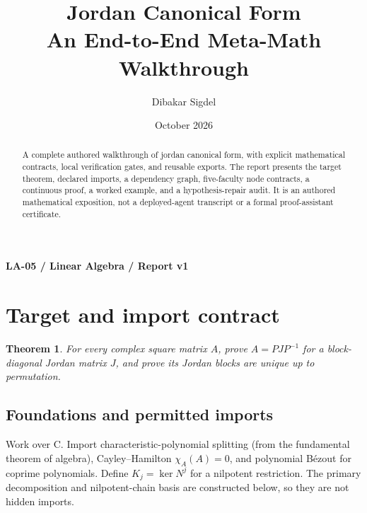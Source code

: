 \documentclass[preprint,12pt,aps,pra,showkeys,amsmath,amssymb,superscriptaddress,floatfix]{revtex4-2}
\newtheorem{theorem}{Theorem}[section]
\theoremstyle{definition}
\theoremstyle{remark}
\begin{document}
\title{Jordan Canonical Form\\[4pt]\large An End-to-End Meta-Math Walkthrough}

\author{Dibakar Sigdel}


\date{October 2026}

\begin{abstract}

A complete authored walkthrough of jordan canonical form, with explicit
mathematical contracts, local verification gates, and reusable exports.
The report presents the target theorem, declared imports, a dependency
graph, five-faculty node contracts, a continuous proof, a worked
example, and a hypothesis-repair audit. It is an authored mathematical
exposition, not a deployed-agent transcript or a formal proof-assistant
certificate.

\end{abstract}\maketitle\linespread{1.12}\selectfont

\noindent\textbf{LA-05 / Linear Algebra / Report v1}

\section{Target and import contract}

\begin{theorem}

For every complex square matrix \(A\), prove \(A=PJP^{-1}\) for a
block-diagonal Jordan matrix \(J\), and prove its Jordan blocks are
unique up to permutation.

\end{theorem}

\subsection{Foundations and permitted imports}

Work over C. Import characteristic-polynomial splitting (from the
fundamental theorem of algebra), Cayley--Hamilton \(\chi _A(A)=0\), and
polynomial Bézout for coprime polynomials. Define
\(K_j=\operatorname{ker} N^j\) for a nilpotent restriction. The primary
decomposition and nilpotent-chain basis are constructed below, so they
are not hidden imports.
\end{document}
